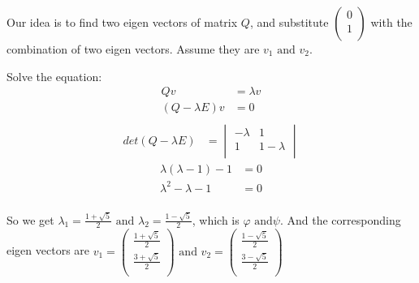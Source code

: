\documentclass[utf-8]{article}
\begin{document}
Our idea is to find two eigen vectors of matrix $Q$, and substitute $
\begin{pmatrix}
  0 \\
  1 \\
\end{pmatrix}
$ with the combination of two eigen vectors. Assume they are $v_1
\mbox{ and } v_2$.

Solve the equation:
\begin{equation}
  \label{eq:1}
  \begin{aligned}
    Qv &=\lambda v \\
    (Q-\lambda E)v &= 0 \\
  \end{aligned}
\end{equation}
\begin{equation}
  \label{eq:2}
  \begin{aligned}
    det(Q-\lambda E) &=
    \begin{vmatrix}
      -\lambda & 1 \\
      1 & 1-\lambda \\
    \end{vmatrix}
  \end{aligned}
\end{equation}
\begin{align*}
  \lambda(\lambda -1)-1&=0 \\
  \lambda^2-\lambda-1 &=0 \\
\end{align*}

So we get $\lambda_1=\frac{1+\sqrt{5}}{2} \mbox{ and }
\lambda_2=\frac{1-\sqrt{5}}{2}$, which is $\varphi \mbox{ and
}\psi$. And the corresponding eigen vectors are $v_1=
\begin{pmatrix}
  \frac{1+\sqrt{5}}{2} \\
  \frac{3+\sqrt{5}}{2} \\
\end{pmatrix} \mbox{ and } v_2=
\begin{pmatrix}
  \frac{1-\sqrt{5}}{2} \\
  \frac{3-\sqrt{5}}{2} \\
\end{pmatrix}
$
\end{document}
